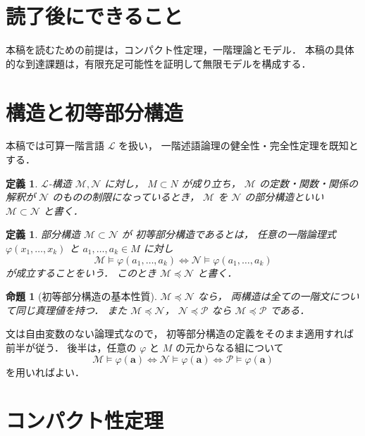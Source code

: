 \documentclass[a5paper,10pt,onecolumn]{jsarticle}
\makeatletter
\theoremstyle{mathnotetheorem}
\newtheorem{definition}[theorem]{定義}
\newtheorem{proposition}[theorem]{命題}
\renewcommand{\proofname}{証明}
\renewenvironment{proof}[1][\proofname]{%
  \par\pushQED{\qed}\normalfont\topsep4\p@\@plus2\p@\relax
  \trivlist\item[\hskip\labelsep\bfseries #1]\ignorespaces
}{\popQED\endtrivlist\@endpefalse}
\makeatother
\begin{document}
\section*{読了後にできること}
本稿を読むための前提は，コンパクト性定理，一階理論とモデル．
本稿の具体的な到達課題は，有限充足可能性を証明して無限モデルを構成する．

\section{構造と初等部分構造}

本稿では可算一階言語 $\mathcal L$ を扱い，
一階述語論理の健全性・完全性定理を既知とする．

\begin{definition}
$\mathcal L$-構造 $\mathcal M,\mathcal N$ に対し，
$M\subset N$ が成り立ち，
$\mathcal M$ の定数・関数・関係の解釈が
$\mathcal N$ のものの制限になっているとき，
$\mathcal M$ を $\mathcal N$ の\emph{部分構造}といい
$\mathcal M\subset\mathcal N$ と書く．
\end{definition}

\begin{definition}
部分構造 $\mathcal M\subset\mathcal N$ が
\emph{初等部分構造}であるとは，
任意の一階論理式 $\varphi(x_1,\dots,x_k)$ と
$a_1,\dots,a_k\in M$ に対し
\[
 \mathcal M\models\varphi(a_1,\dots,a_k)
 \iff
 \mathcal N\models\varphi(a_1,\dots,a_k)
\]
が成立することをいう．
このとき $\mathcal M\preccurlyeq\mathcal N$ と書く．
\end{definition}

\begin{proposition}[初等部分構造の基本性質]\label{prop:elementary}
$\mathcal M\preccurlyeq\mathcal N$ なら，
両構造は全ての一階文について同じ真理値を持つ．
また
$\mathcal M\preccurlyeq\mathcal N$，
$\mathcal N\preccurlyeq\mathcal P$ なら
$\mathcal M\preccurlyeq\mathcal P$ である．
\end{proposition}
\begin{proof}
文は自由変数のない論理式なので，
初等部分構造の定義をそのまま適用すれば前半が従う．
後半は，任意の $\varphi$ と $M$ の元からなる組について
\[
 \mathcal M\models\varphi(\boldsymbol a)
 \iff\mathcal N\models\varphi(\boldsymbol a)
 \iff\mathcal P\models\varphi(\boldsymbol a)
\]
を用いればよい．
\end{proof}

\section{コンパクト性定理}
\end{document}
